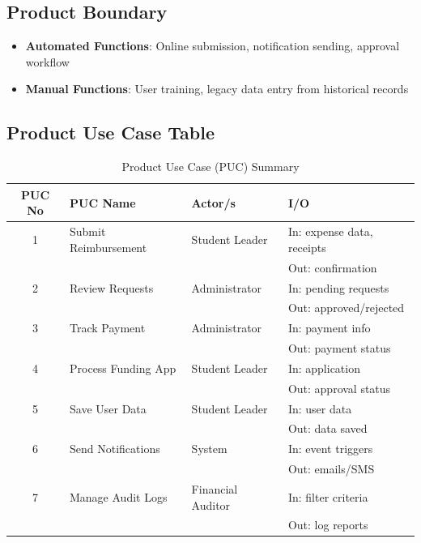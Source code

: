 \documentclass[12pt]{article}
\begin{document}
\subsection{Product Boundary}
\begin{itemize}
  \item \textbf{Automated Functions}: Online submission, notification sending, approval workflow
  \item \textbf{Manual Functions}: User training, legacy data entry from historical records
\end{itemize}

\subsection{Product Use Case Table}
\begin{table}[h]
  \centering
  \caption{Product Use Case (PUC) Summary}
  \begin{tabular}{|c|l|l|l|}
  \hline
   \textbf{PUC No} & \textbf{PUC Name} & \textbf{Actor/s} & \textbf{I/O} \\ \hline
   1 & Submit Reimbursement & Student Leader & In: expense data, receipts \\
     & & & Out: confirmation \\
   \hline
   2 & Review Requests & Administrator & In: pending requests \\
     & & & Out: approved/rejected \\
   \hline
   3 & Track Payment & Administrator & In: payment info \\
     & & & Out: payment status \\
   \hline
   4 & Process Funding App & Student Leader & In: application \\
     & & & Out: approval status \\
   \hline
   5 & Save User Data & Student Leader & In: user data \\
     & & & Out: data saved \\
   \hline
   6 & Send Notifications & System & In: event triggers \\
     & & & Out: emails/SMS \\
   \hline
   7 & Manage Audit Logs & Financial Auditor & In: filter criteria \\
     & & & Out: log reports \\
   \hline
  \end{tabular}
\end{table}

\end{document}
